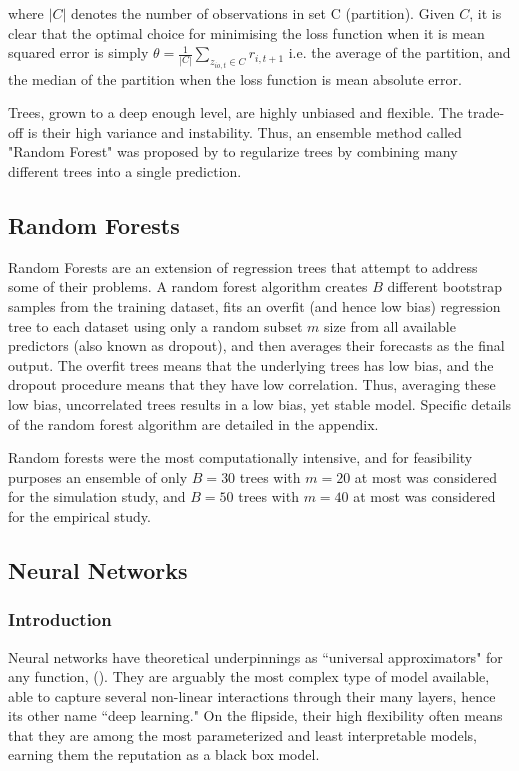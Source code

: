 \documentclass[a4paper, table]{article}
\begin{document}
where $|C|$ denotes the number of observations in set C (partition). Given $C$, it is clear that the optimal choice for minimising the loss function when it is mean squared error is simply $\theta = \frac{1}{|C|} \sum_{z_{io,t}\in C}^{ }r_{i,t+1}$ i.e. the average of the partition, and the median of the partition when the loss function is mean absolute error.

Trees, grown to a deep enough level, are highly unbiased and flexible. The trade-off is their high variance and instability. Thus, an ensemble method called "Random Forest" was proposed by \cite{breiman_random_2001} to regularize trees by combining many different trees into a single prediction.

\subsection{Random Forests}
Random Forests are an extension of regression trees that attempt to address some of their problems. A random forest algorithm creates $B$ different bootstrap samples from the training dataset, fits an overfit (and hence low bias) regression tree to each dataset using only a random subset $m$ size from all available predictors (also known as dropout), and then averages their forecasts as the final output. The overfit trees means that the underlying trees has low bias, and the dropout procedure means that they have low correlation. Thus, averaging these low bias, uncorrelated trees results in a low bias, yet stable model. Specific details of the random forest algorithm are detailed in the appendix.

Random forests were the most computationally intensive, and for feasibility purposes an ensemble of only $B = 30$ trees with $m = 20$ at most was considered for the simulation study, and $B = 50$ trees with $m = 40$ at most was considered for the empirical study.

\newpage

\subsection{Neural Networks}

\subsubsection{Introduction}

Neural networks have theoretical underpinnings as ``universal approximators" for any function, (\cite{hornik_multilayer_1989}). They are arguably the most complex type of model available, able to capture several non-linear interactions through their many layers, hence its other name ``deep learning."  On the flipside, their high flexibility often means that they are among the most parameterized and least interpretable models, earning them the reputation as a black box model.
\end{document}

